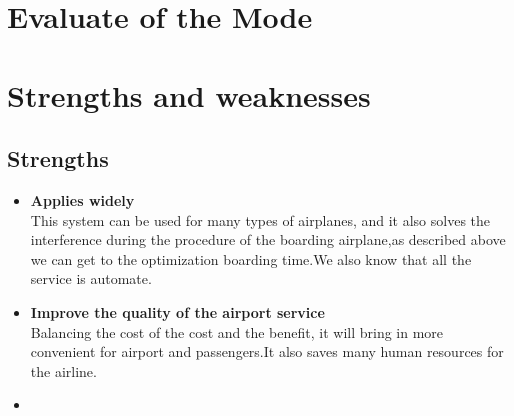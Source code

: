 \documentclass{mcmthesis}
\begin{document}
\section{Evaluate of the Mode}

\section{Strengths and weaknesses}
\lipsum[12]

\subsection{Strengths}
\begin{itemize}
\item \textbf{Applies widely}\\
This  system can be used for many types of airplanes, and it also
solves the interference during  the procedure of the boarding
airplane,as described above we can get to the  optimization
boarding time.We also know that all the service is automate.
\item \textbf{Improve the quality of the airport service}\\
Balancing the cost of the cost and the benefit, it will bring in
more convenient  for airport and passengers.It also saves many
human resources for the airline. \item \textbf{}
\end{itemize}


\end{document}
